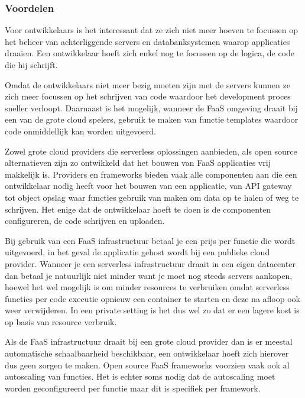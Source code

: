 \subsubsection{Voordelen}
\begin{description}[style=unboxed, labelwidth=\linewidth, listparindent =0pt]
    \item[Geen beheer van infrastructuur]
    Voor ontwikkelaars is het interessant dat ze zich niet meer hoeven te focussen op het beheer van achterliggende servers en databanksystemen waarop applicaties draaien. Een ontwikkelaar hoeft zich enkel nog te focussen op de logica, de code die hij schrijft.
    \\
    
    \item [Snellere development en deployment]
    Omdat de ontwikkelaars niet meer bezig moeten zijn met de servers kunnen ze zich meer focussen op het schrijven van code waardoor het development proces sneller verloopt. Daarnaast is het mogelijk, wanneer de FaaS omgeving draait bij een van de grote cloud spelers, gebruik te maken van functie templates waardoor code onmiddellijk kan worden uitgevoerd.
    \\
    
    \item [Makkelijk in gebruik]
    Zowel grote cloud providers die serverless oplossingen aanbieden, als open source alternatieven zijn zo ontwikkeld dat het bouwen van FaaS applicaties vrij makkelijk is. Providers en frameworks bieden vaak alle componenten aan die een ontwikkelaar nodig heeft voor het bouwen van een applicatie, van API gateway tot object opslag waar functies gebruik van maken om data op te halen of weg te schrijven. Het enige dat de ontwikkelaar hoeft te doen is de componenten configureren, de code schrijven en uploaden.
    \\
    
    \item [Lagere kosten]
    Bij gebruik van een FaaS infrastructuur betaal je een prijs per functie die wordt uitgevoerd, in het geval de applicatie gehost wordt bij een publieke cloud provider. Wanneer je een serverless infrastructuur draait in een eigen datacenter dan betaal je natuurlijk niet minder want je moet nog steeds servers aankopen, hoewel het wel mogelijk is om minder resources te verbruiken omdat serverless functies per code executie opnieuw een container te starten en deze na afloop ook weer verwijderen. In een private setting is het dus wel zo dat er een lagere kost is op basis van resource verbruik.
    \\
    
     \item [Verbeterde schaalbaarheid]
     Als de FaaS infrastructuur draait bij een grote cloud provider dan is er meestal automatische schaalbaarheid beschikbaar, een ontwikkelaar hoeft zich hierover dus geen zorgen te maken. Open source FaaS frameworks voorzien vaak ook al autoscaling van functies. Het is echter soms nodig dat de autoscaling moet worden geconfigureerd per functie maar dit is specifiek per framework.
     \\
\end{description}

